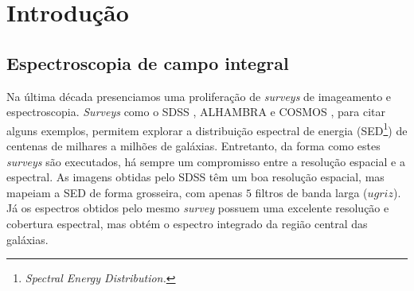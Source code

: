 


\chapter{Introdução}
\label{sec:intro}


\section{Espectroscopia de campo integral}

Na última década presenciamos uma proliferação de {\em surveys} de imageamento e
espectroscopia. {\em Surveys} como o SDSS \citep{York2000}, ALHAMBRA
\citep{Moles2008} e COSMOS \citep{Scoville2007}, para citar alguns exemplos,
permitem explorar a distribuição espectral de energia (SED\footnote{\em Spectral
Energy Distribution.}) de centenas de milhares a milhões de galáxias.
Entretanto, da forma como estes {\em surveys} são executados, há sempre um
compromisso entre a resolução espacial e a espectral. As imagens obtidas pelo
SDSS têm um boa resolução espacial, mas mapeiam a SED de forma grosseira, com
apenas $5$ filtros de banda larga ($ugriz$). Já os espectros obtidos pelo mesmo
{\em survey} possuem uma excelente resolução e cobertura espectral, mas obtém o
espectro integrado da região central das galáxias.

